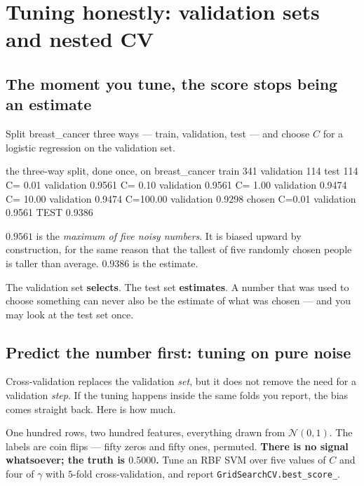 \documentclass[11pt]{article}
\begin{document}
\section{Tuning honestly: validation sets and nested CV}
\label{sec:nested}

\subsection{The moment you tune, the score stops being an estimate}

Split breast\_cancer three ways --- train, validation, test --- and choose $C$
for a logistic regression on the validation set.

\begin{codeout}
the three-way split, done once, on breast_cancer
   train 341   validation 114   test 114
      C=  0.01  validation 0.9561
      C=  0.10  validation 0.9561
      C=  1.00  validation 0.9474
      C= 10.00  validation 0.9474
      C=100.00  validation 0.9298
   chosen C=0.01   validation 0.9561   TEST 0.9386
\end{codeout}

$0.9561$ is the \emph{maximum of five noisy numbers}. It is biased upward by
construction, for the same reason that the tallest of five randomly chosen
people is taller than average. $0.9386$ is the estimate.

\begin{keyidea}
The validation set \textbf{selects}. The test set \textbf{estimates}. A number
that was used to choose something can never also be the estimate of what was
chosen --- and you may look at the test set once.
\end{keyidea}

\subsection{Predict the number first: tuning on pure noise}
\label{sec:noise}

Cross-validation replaces the validation \emph{set}, but it does not remove
the need for a validation \emph{step}. If the tuning happens inside the same
folds you report, the bias comes straight back. Here is how much.

One hundred rows, two hundred features, everything drawn from
$\mathcal{N}(0,1)$. The labels are coin flips --- fifty zeros and fifty ones,
permuted. \textbf{There is no signal whatsoever; the truth is $0.5000$.} Tune
an RBF SVM over five values of $C$ and four of $\gamma$ with $5$-fold
cross-validation, and report \texttt{GridSearchCV.best\_score\_}.
\end{document}
